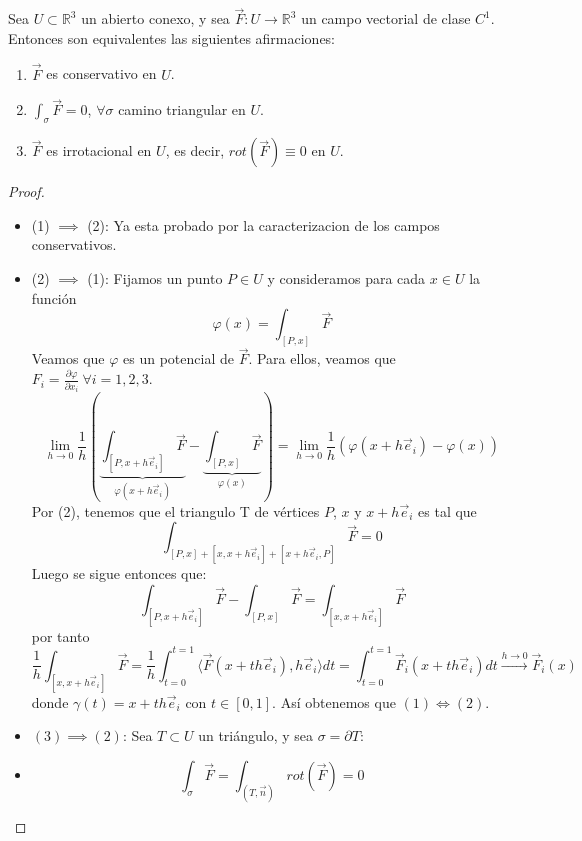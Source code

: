 \begin{teorema}
    Sea $U \subset \mathbb{R}^3$ un abierto conexo, y sea $\vec{F} : U \to \mathbb{R}^3$ un campo vectorial de clase $C^1$. Entonces son equivalentes las siguientes afirmaciones:
    \begin{enumerate}
        \item $\vec{F}$ es conservativo en $U$.
        \item $\int_\sigma \vec{F} = 0$, $\forall \sigma$ camino triangular en $U$.
        \item $\vec{F}$ es irrotacional en $U$, es decir, $rot(\vec{F}) \equiv 0$ en $U$.
    \end{enumerate}
\end{teorema}

\begin{proof}
    \leavevmode
    \begin{itemize}
        \item (1) $\implies$ (2): Ya esta probado por la caracterizacion de los campos conservativos.
        \item (2) $\implies$ (1): Fijamos un punto $P \in U$ y consideramos para cada $x \in U$ la función
        $$ \varphi(x) = \int_{[P,x]} \vec{F}$$
        Veamos que $\varphi$ es un potencial de $\vec{F}$. Para ellos, veamos que $F_i = \frac{\partial \varphi}{\partial x_i} \ \forall i = 1,2,3$.
        $$ \lim_{h \to 0} \frac{1}{h} \left(\underbrace{\int_{[P,x + h\vec{e}_i]} \vec{F}}_{\varphi(x+h\vec{e}_i)} - \underbrace{\int_{[P,x]} \vec{F}}_{\varphi(x)} \right) = \lim_{h \to 0} \frac{1}{h} \left( \varphi(x + h\vec{e}_i) - \varphi(x) \right)$$
        Por (2), tenemos que el triangulo T de vértices $P$, $x$ y $x + h\vec{e}_i$ es tal que 
        $$\int_{[P,x] + [x,x + h\vec{e}_i] + [x + h\vec{e}_i,P]} \vec{F} = 0$$
        Luego se sigue entonces que: 
        $$ \int_{[P,x + h\vec{e}_i]} \vec{F} - \int_{[P,x]} \vec{F} = \int_{[x,x + h\vec{e}_i]} \vec{F}$$
        por tanto 
        $$\frac{1}{h} \int_{[x,x + h\vec{e}_i]} \vec{F} = \frac{1}{h} \int_{t =0}^{t=1} \langle \vec{F}(x + t h \vec{e}_i), h \vec{e}_i \rangle dt = \int_{t=0}^{t=1} \vec{F}_i(x + t h \vec{e}_i)dt \xrightarrow{h \to 0} \vec{F}_i(x)$$
        donde $\gamma(t) = x + t h \vec{e}_i$ con $t \in [0,1]$. Así obtenemos que $(1) \iff (2)$.
        \item $(3) \implies (2)$: Sea $T \subset U$ un triángulo, y sea $ \sigma = \partial T$:
        \item[] $$ \int_\sigma \vec{F} = \int_{(T, \vec{n})} rot(\vec{F}) = 0$$
    \end{itemize}
\end{proof}

